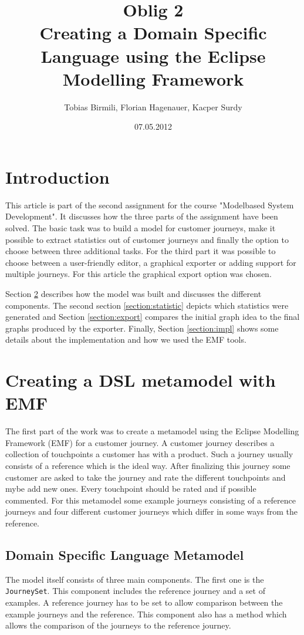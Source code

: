 \documentclass[12pt]{scrartcl}
\title{Oblig 2 \\ Creating a Domain Specific Language using the Eclipse Modelling Framework}
\author{Tobias Birmili, Florian Hagenauer, Kacper Surdy}
\date{07.05.2012}
\begin{document}
\maketitle

\tableofcontents

\section{Introduction}

This article is part of the second assignment for the course "Modelbased System Development". It discusses
how the three parts of the assignment have been solved. The basic task was to build a model for customer journeys,
make it possible to extract statistics out of customer journeys and finally the option to choose between three
additional tasks. For the third part it was possible to choose between a user-friendly editor, a graphical exporter
or adding support for multiple journeys. For this article the graphical export option was chosen.

Section \ref{section:model} describes how the model was built and discusses the different components. The second
section \ref{section:statistic} depicts which statistics were generated and Section \ref{section:export}
compares the initial graph idea to the final graphs produced by the exporter. Finally, Section \ref{section:impl} shows
some details about the implementation and how we used the EMF tools.

\section{Creating a DSL metamodel with EMF} 
\label{section:model}

The first part of the work was to create a metamodel using the Eclipse Modelling Framework (EMF) for a customer
journey. A customer journey describes a collection of touchpoints a customer has with a product. Such a journey
usually consists of a reference which is the ideal way. After finalizing this journey some customer are asked
to take the journey and rate the different touchpoints and mybe add new ones. Every touchpoint should be rated
and if possible commented. For this metamodel some example journeys consisting of a reference journeys and four
different customer journeys which differ in some ways from the reference. 

\subsection{Domain Specific Language Metamodel}
The model itself consists of three main components. The first one is the \lstinline!JourneySet!. This component
includes the reference journey and a set of examples. A reference journey has to be set to allow comparison
between the example journeys and the reference. This component also has a method which allows the comparison
of the journeys to the reference journey. 
\end{document}
